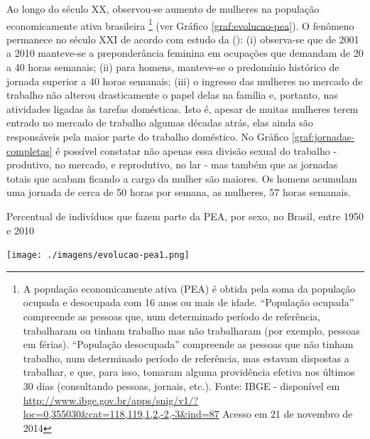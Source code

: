 Ao longo do século XX, observou-se aumento de mulheres na população economicamente ativa brasileira%
\footnote{A população economicamente ativa (PEA) é obtida pela soma da população ocupada e desocupada com 16 anos ou mais de idade. ``População ocupada'' compreende as pessoas que, num determinado período de referência, trabalharam ou tinham trabalho mas não trabalharam (por exemplo, pessoas em férias). ``População desocupada'' compreende as pessoas que não tinham trabalho, num determinado período de referência, mas estavam dispostas a trabalhar, e que, para isso, tomaram alguma providência efetiva nos últimos 30 dias (consultando pessoas, jornais, etc.). Fonte: IBGE - disponível em \url{http://www.ibge.gov.br/apps/snig/v1/?loc=0,355030&cat=118,119,1,2,-2,-3&ind=87} Acesso em 21 de novembro de 2014} 
(ver Gráfico \ref{graf:evolucao-pea}). 
O fenômeno permanece no século XXI de acordo com estudo da  (\citeyear{ABRAMO2010}):
(i) observa-se que de 2001 a 2010 manteve-se a preponderância feminina em ocupações que demandam de 20 a 40 horas semanais;
(ii) para homens, manteve-se o predomínio histórico de jornada superior a 40 horas semanais;
(iii) o ingresso das mulheres no mercado de trabalho não alterou drasticamente o papel delas na família e, portanto, nas atividades ligadas às tarefas domésticas. Isto é, apesar de muitas mulheres terem entrado no mercado de trabalho algumas décadas atrás, elas ainda são responsáveis pela maior parte do trabalho doméstico. No Gráfico \ref{graf:jornadas-completas} é possível constatar não apenas essa divisão sexual do trabalho - produtivo, no mercado, e reprodutivo, no lar - mas também que as jornadas totais que acabam ficando a cargo da mulher são maiores. Os homens acumulam uma jornada de cerca de 50 horas por semana, as mulheres, 57 horas semanais.

\begin{grafico}[htb]%
    \caption{\label{graf:evolucao-pea}Percentual de indivíduos que fazem parte da PEA, por sexo, no Brasil, entre 1950 e 2010}%
    \begin{center}%
        \texttt{[image: ./imagens/evolucao-pea1.png]}%
    \end{center}%
\end{grafico}%


